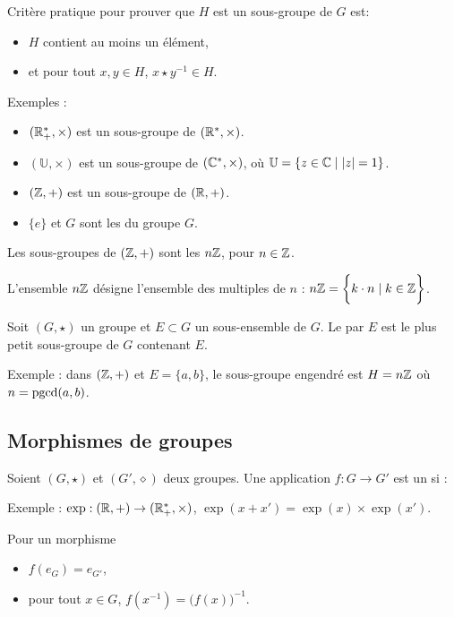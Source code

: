 \documentclass[10pt,class=article,crop=false]{standalone}
\begin{document}
\begin{multicols}{2}
Critère pratique pour prouver que $H$ est un sous-groupe de $G$ est:
	\begin{itemize}
		\item $H$ contient au moins un élément,
		\item et pour tout $x,y \in H$, $x \star y^{-1} \in H$.
	\end{itemize}

Exemples :
\begin{itemize}
	\item $(\mathbb{R}^*_+,\times)$ est un sous-groupe de $(\mathbb{R}^*,\times)$.
	\item $(\mathbb{U},\times)$ est un sous-groupe de $(\mathbb{C}^*,\times)$, où
	$\mathbb{U} = \{ z \in \mathbb{C} \mid |z|=1 \}$.
	\item $(\mathbb{Z},+)$ est un sous-groupe de $(\mathbb{R},+)$.
	\item $\{e\}$ et $G$ sont les  du groupe $G$.
\end{itemize}

\begin{proposition}
Les sous-groupes de $(\mathbb{Z},+)$ sont les $n\mathbb{Z}$, pour $n\in \mathbb{Z}$.
\end{proposition}

L'ensemble $n\mathbb{Z}$ désigne l'ensemble des multiples de $n$ : $n\mathbb{Z} = \bigg\{ k\cdot n \mid  k \in \mathbb{Z} \bigg\}$.


Soit $(G,\star)$ un groupe et $E \subset G$ un sous-ensemble de $G$.
Le  par $E$ est le plus petit sous-groupe de
$G$ contenant $E$.

Exemple : dans $(\mathbb{Z},+)$ et $E = \{a,b\}$, le sous-groupe engendré est $H = n\mathbb{Z}$ où $n=\mathop{\text{pgcd}}(a,b)$.

\subsection{Morphismes de groupes}


Soient $(G,\star)$ et $(G',\diamond)$ deux groupes. Une application
$f : G \longrightarrow G'$ est un  si :


Exemple : $\exp : (\mathbb{R},+) \to (\mathbb{R}_+^*,\times)$, $\exp(x+x')= \exp(x) \times \exp(x')$.

Pour un morphisme
\begin{itemize}
	\item $f(e_G) = e_{G'}$,
	\item pour tout $x \in G$, $f(x^{-1}) = \big(f(x)\big)^{-1}$.
\end{itemize}



\end{multicols}
\end{document}
